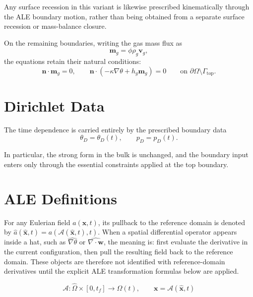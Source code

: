 \documentclass[11pt]{article}
\begin{document}
Any surface recession in this variant is likewise prescribed kinematically
through the ALE boundary motion, rather than being obtained from a separate
surface recession or mass-balance closure.

On the remaining boundaries, writing the gas mass flux as
\begin{equation}
\boldsymbol{m}_g = \phi \rho_g \mathbf{v}_g,
\end{equation}
the equations retain their natural conditions:
\begin{equation}
\boldsymbol{n}\cdot \boldsymbol{m}_g = 0,
\qquad
\boldsymbol{n}\cdot\left(-\kappa \nabla \theta + h_g \boldsymbol{m}_g\right) = 0
\qquad \text{on } \partial \Omega \setminus \Gamma_{\mathrm{top}}.
\end{equation}

\section{Dirichlet Data}

The time dependence is carried entirely by the prescribed boundary data
\begin{equation}
\theta_D = \theta_D(t),
\qquad
p_D = p_D(t).
\end{equation}

In particular, the strong form in the bulk is unchanged, and the boundary input
enters only through the essential constraints applied at the top boundary.


\section{ALE Definitions}

For any Eulerian field $a(\mathbf{x},t)$, its pullback to the reference domain is
denoted by $\widehat{a}(\widehat{\mathbf{x}},t) = a(\mathcal{A}(\widehat{\mathbf{x}},t),t)$.
When a spatial differential operator appears inside a hat, such as
$\widehat{\nabla \theta}$ or $\widehat{\nabla \cdot \mathbf{w}}$, the meaning is:
first evaluate the derivative in the current configuration, then pull the resulting
field back to the reference domain. These objects are therefore not identified with
reference-domain derivatives until the explicit ALE transformation formulas below
are applied.

\begin{equation}
    \mathcal{A}: \widehat{\Omega} \times [0,t_f] \to \Omega(t), \qquad \mathbf{x} = \mathcal{A}(\widehat{\mathbf{x}}, t)
\end{equation}
\end{document}
